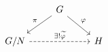 \documentclass{article}
\begin{document}
    \begin{equation*}
        \begin{tikzcd}
            & G \ar[dl, "\pi"'] \ar[dr, "\phi"] & \\
            G/N \ar[rr, "\ex!\widetilde{\phi}", dashed] & & H
        \end{tikzcd}
    \end{equation*}
\end{document}
